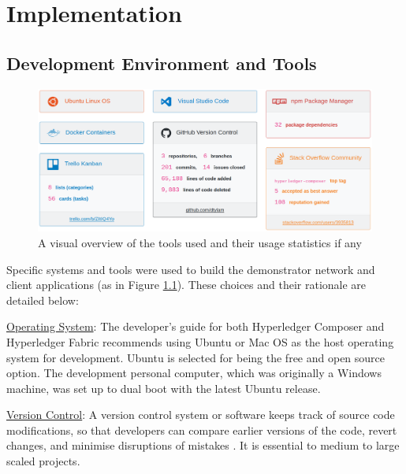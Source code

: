 \chapter{Implementation}

\graphicspath{{Chapter6/Figs/Raster/}{Chapter6/Figs/}}

\section{Development Environment and Tools}

\begin{figure}[!ht] 
    \centering    
    \includegraphics[width=1.0\textwidth]{platform_stats}
    \caption[Development Tools and Usage Statistics]
        {A visual overview of the tools used and their usage statistics if any} 
    \label{fig:platform_stats}
\end{figure}

Specific systems and tools were used to build the demonstrator network and client applications (as in Figure \ref{fig:platform_stats}). 
These choices and their rationale are detailed below:

\underline{Operating System}: The developer's guide for both Hyperledger Composer and Hyperledger Fabric 
recommends using Ubuntu or Mac OS as the host operating system for development. 
Ubuntu is selected for being the free and open source option. The development personal computer, which was originally 
a Windows machine, was set up to dual boot with the latest Ubuntu release.

\underline{Version Control}: A version control system or software keeps track of source code modifications, 
so that developers can compare earlier versions of the code, revert changes, and 
minimise disruptions of mistakes \citep{atlassian2018vcs}. It is essential to medium to large scaled projects.

